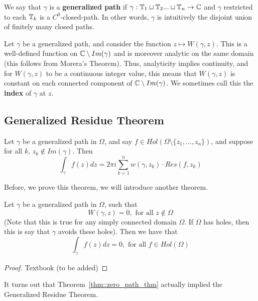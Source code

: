 \begin{definition}
We say that $\gamma$ is a \textbf{generalized path} if $\gamma: \mathbb{T}_1 \sqcup \mathbb{T}_2 ... \sqcup \mathbb{T}_n \to \mathbb{C}$ and $\gamma$ restricted to each $\mathbb{T}_k$ is a $C^0$-closed-path. In other words, $\gamma$ is intuitively the disjoint union of finitely many closed paths.
\end{definition}

\begin{remark}
Let $\gamma$ be a generalized path, and consider the function $z \mapsto W(\gamma, z)$. This is a well-defined function on $\mathbb{C} \setminus Im(\gamma)$ and is moreover analytic on the same domain (this follows from Morera's Theorem). Thus, analyticity implies continuity, and for $W(\gamma, z)$ to be a continuous integer value, this means that $W(\gamma, z)$ is constant on each connected component of $\mathbb{C} \setminus Im(\gamma)$. We sometimes call this the \textbf{index} of $\gamma$ at $z$.
\end{remark}

\subsection{Generalized Residue Theorem}

\begin{theorem}
Let $\gamma$ be a generalized path in $\Omega$, and say $f \in Hol(\Omega \setminus \{z_1, ..., z_n\})$, and suppose for all $k$, $z_k \not \in Im(\gamma)$. Then
\[\int_{\gamma} f(z) dz = 2 \pi i \sum_{k = 1}^n w(\gamma, z_k) \cdot Res(f, z_k)\]
\end{theorem}

Before, we prove this theorem, we will introduce another theorem.

\begin{theorem}\label{thm::zero_path_thm}
Let $\gamma$ be a generalized path in $\Omega$, such that
\[W(\gamma, z) = 0, \text{ for all } z \not \in \Omega\]
(Note that this is true for any simply connected domain $\Omega$. If $\Omega$ has holes, then this is say that $\gamma$ avoids these holes). Then we have that
\[\int_\gamma f(z) dz = 0, \text{ for all $f \in Hol(\Omega)$}\]
\end{theorem}

\begin{proof}
Textbook (to be added)
\end{proof}

It turns out that Theorem~\ref{thm::zero_path_thm} actually implied the Generalized Residue Theorem.

